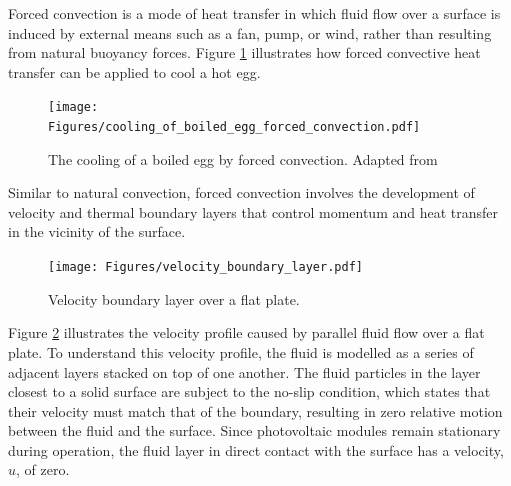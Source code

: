  \label{sec:forced_convection_and_relevant_cooling_methods}
Forced convection is a mode of heat transfer in which fluid flow over a surface is induced by external means such as a fan, pump, or wind, rather than resulting from natural buoyancy forces. \cite{Cengel2014IntroductionConcepts} Figure \ref{fig:cooling_of_boiled_egg_forced_convection} illustrates how forced convective heat transfer can be applied to cool a hot egg.\par

\begin{figure}[ht]
    \centering
    \texttt{[image: Figures/cooling\_of\_boiled\_egg\_forced\_convection.pdf]}
    \caption{The cooling of a boiled egg by forced convection. Adapted from \cite{Cengel2014IntroductionConcepts}}
    \label{fig:cooling_of_boiled_egg_forced_convection}
\end{figure}


Similar to natural convection, forced convection involves the development of velocity and thermal boundary layers that control momentum and heat transfer in the vicinity of the surface.\vspace{0.5em}

\begin{figure}[H]
    \centering
    \texttt{[image: Figures/velocity\_boundary\_layer.pdf]}
    \caption{Velocity boundary layer over a flat plate. \cite{Cengel2014FundamentalsConvection}}
    \label{fig:velocity_boundary_layer}
\end{figure}

Figure \ref{fig:velocity_boundary_layer} illustrates the velocity profile caused by parallel fluid flow over a flat plate. To understand this velocity profile, the fluid is modelled as a series of adjacent layers stacked on top of one another. The fluid particles in the layer closest to a solid surface are subject to the no-slip condition, which states that their velocity must match that of the boundary, resulting in zero relative motion between the fluid and the surface. Since photovoltaic modules remain stationary during operation, the fluid layer in direct contact with the surface has a velocity, $u$, of zero. \cite{Cengel2014FundamentalsConvection}\vspace{0.5em}

